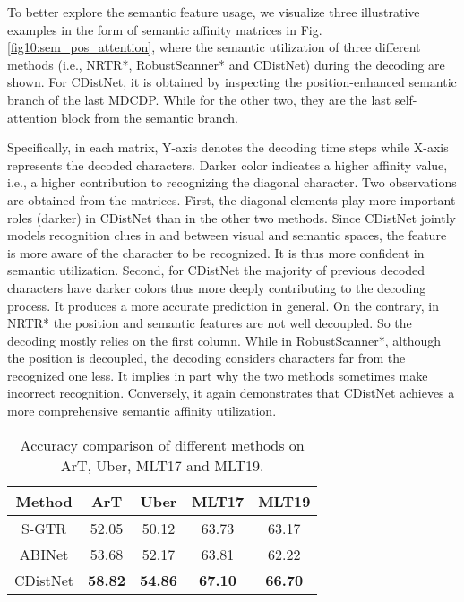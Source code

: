 To better explore the semantic feature usage, we visualize three illustrative examples in the form of semantic affinity matrices in Fig.\ref{fig10:sem_pos_attention}, where the semantic utilization of three different methods (i.e., NRTR*, RobustScanner* and CDistNet) during the decoding are shown. For CDistNet, it is obtained by inspecting the position-enhanced semantic branch of the last MDCDP. While for the other two, they are the last self-attention block from the semantic branch.

Specifically, in each matrix, Y-axis denotes the decoding time steps while X-axis represents the decoded characters. Darker color indicates a higher affinity value, i.e., a higher contribution to recognizing the diagonal character. Two observations are obtained from the matrices. First, the diagonal elements play more important roles (darker) in CDistNet than in the other two methods. Since CDistNet jointly models recognition clues in and between visual and semantic spaces, the feature is more aware of the character to be recognized. It is thus more confident in semantic utilization. Second, for CDistNet the majority of previous decoded characters have darker colors thus more deeply contributing to the decoding process. It produces a more accurate prediction in general. On the contrary, in NRTR* the position and semantic features are not well decoupled. So the decoding mostly relies on the first column. While in RobustScanner*, although the position is decoupled, the decoding considers characters far from the recognized one less. It implies in part why the two methods sometimes make incorrect recognition. Conversely, it again demonstrates that CDistNet achieves a more comprehensive semantic affinity utilization.


\begin{table*}[]
\centering
\caption{Accuracy comparison of different methods on ArT, Uber, MLT17 and MLT19.}
\begin{tabular}{c|cc|cc}
\hline
Method   & ArT            & Uber           & MLT17         & MLT19         \\ \hline
S-GTR \citep{he2021S-GTR}      & 52.05          & 50.12          & 63.73         & 63.17         \\
ABINet \citep{ABInet21CVPR}   & 53.68          & 52.17          & 63.81         & 62.22         \\ \hline
CDistNet & \textbf{58.82} & \textbf{54.86} & \textbf{67.10} & \textbf{66.70} \\ \hline
\end{tabular}
\label{tab:art_uber_mlt}
\end{table*}


